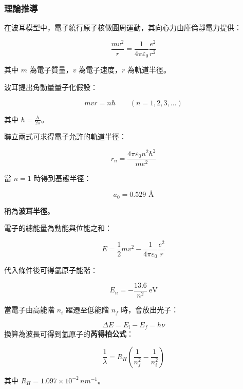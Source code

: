 \subsubsection{理論推導}

在波耳模型中，電子繞行原子核做圓周運動，其向心力由庫倫靜電力提供：

\[
\frac{mv^2}{r}=\frac{1}{4\pi\varepsilon_0}\frac{e^2}{r^2}
\]

其中 $m$ 為電子質量，$v$ 為電子速度，$r$ 為軌道半徑。

\vspace{0.3cm}

波耳提出角動量量子化假設：

\[
mvr = n\hbar \qquad (n=1,2,3,\dots)
\]

其中 $\hbar=\frac{h}{2\pi}$。

\vspace{0.3cm}

聯立兩式可求得電子允許的軌道半徑：

\[
r_n = \frac{4\pi\varepsilon_0 n^2 \hbar^2}{m e^2}
\]

當 $n=1$ 時得到基態半徑：

\[
a_0 = 0.529 \text{ Å}
\]

稱為\textbf{波耳半徑}。

\vspace{0.3cm}

電子的總能量為動能與位能之和：

\[
E = \frac{1}{2}mv^2 - \frac{1}{4\pi\varepsilon_0}\frac{e^2}{r}
\]

代入條件後可得氫原子能階：

\[
E_n = -\frac{13.6}{n^2}\ \text{eV}
\]

\vspace{0.3cm}

當電子由高能階 $n_i$ 躍遷至低能階 $n_f$ 時，會放出光子：

\[
\Delta E = E_i - E_f = h\nu
\]
換算為波長可得到氫原子的\textbf{芮得柏公式}：

\[
\frac{1}{\lambda} = R_H
\left(
\frac{1}{n_f^2} - \frac{1}{n_i^2}
\right)
\]

其中 $R_H = 1.097\times10^{-2}\, nm^{-1}$。